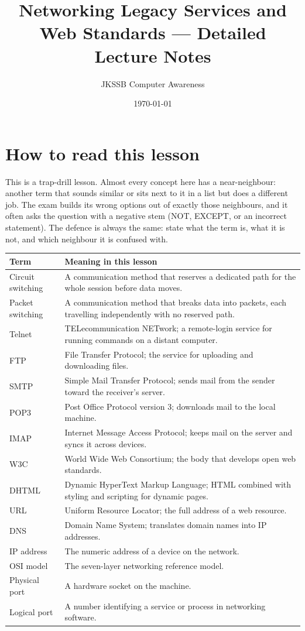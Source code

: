 \documentclass[11pt]{article}
\title{Networking Legacy Services and Web Standards --- Detailed Lecture Notes}
\author{JKSSB Computer Awareness}
\date{\today}
\begin{document}
\maketitle

\section{How to read this lesson}
This is a trap-drill lesson. Almost every concept here has a near-neighbour:
another term that sounds similar or sits next to it in a list but does a
different job. The exam builds its wrong options out of exactly those
neighbours, and it often asks the question with a negative stem (NOT, EXCEPT,
or an incorrect statement). The defence is always the same: state what the
term is, what it is not, and which neighbour it is confused with.

\begin{center}
\begin{tabular}{p{}p{}}
\toprule
\textbf{Term} & \textbf{Meaning in this lesson} \\
\midrule
Circuit switching & A communication method that reserves a dedicated path for the whole session before data moves. \\
Packet switching & A communication method that breaks data into packets, each travelling independently with no reserved path. \\
Telnet & TELecommunication NETwork; a remote-login service for running commands on a distant computer. \\
FTP & File Transfer Protocol; the service for uploading and downloading files. \\
SMTP & Simple Mail Transfer Protocol; sends mail from the sender toward the receiver's server. \\
POP3 & Post Office Protocol version 3; downloads mail to the local machine. \\
IMAP & Internet Message Access Protocol; keeps mail on the server and syncs it across devices. \\
W3C & World Wide Web Consortium; the body that develops open web standards. \\
DHTML & Dynamic HyperText Markup Language; HTML combined with styling and scripting for dynamic pages. \\
URL & Uniform Resource Locator; the full address of a web resource. \\
DNS & Domain Name System; translates domain names into IP addresses. \\
IP address & The numeric address of a device on the network. \\
OSI model & The seven-layer networking reference model. \\
Physical port & A hardware socket on the machine. \\
Logical port & A number identifying a service or process in networking software. \\
\bottomrule
\end{tabular}
\end{center}
\end{document}
